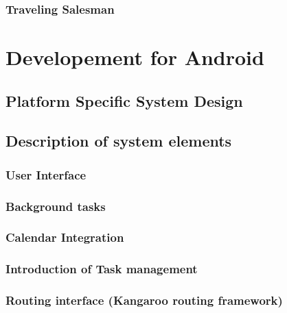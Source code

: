 \documentclass[11pt,a4paper]{scrreprt}
\begin{document}
	\subsection{Traveling Salesman}
	\label{sub:routing_tsm}
	
	

\chapter{Developement for Android} %
\label{chp:android}
%

	\section{Platform Specific System Design} %
	\label{sec:android_desing}
	
	
	\section{Description of system elements} %
	
	\subsection{User Interface} %
	\label{sec:user_interface}
	
	
	\subsection{Background tasks} %
	\label{sec:android_integration}
	
	
	\subsection{Calendar Integration} %
	\label{sec:android_calendar}
	
	
	\subsection{Introduction of Task management} %
	\label{sec:android_task}
	
		
	\subsection{Routing interface (Kangaroo routing framework)} %
	\label{sub:routing_interface}
	
	
\end{document}
